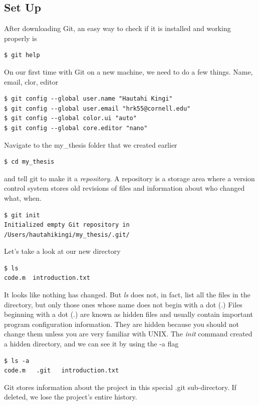 \documentclass{article}
\begin{document}
\subsection{Set Up}
After downloading Git, an easy way to check if it is installed and working properly is
\begin{lstlisting}
$ git help
\end{lstlisting}
On our first time with Git on a new machine, we need to do a few things. Name, email, clor, editor
\begin{lstlisting}
$ git config --global user.name "Hautahi Kingi"
$ git config --global user.email "hrk55@cornell.edu"
$ git config --global color.ui "auto"
$ git config --global core.editor "nano"
\end{lstlisting}
Navigate to the my\_thesis folder that we created earlier
\begin{lstlisting}
$ cd my_thesis
\end{lstlisting}
and tell git to make it a \emph{repository}. A repository is a storage area where a version control system stores old revisions of files and information about who changed what, when.
\begin{lstlisting}
$ git init
Initialized empty Git repository in /Users/hautahikingi/my_thesis/.git/
\end{lstlisting}
Let's take a look at our new directory
\begin{lstlisting}[frame=single]
$ ls
code.m	introduction.txt
\end{lstlisting}
It looks like nothing has changed. But \emph{ls} does not, in fact, list all the files in the directory, but only those ones whose name does not begin with a dot (.) Files beginning with a dot (.) are known as hidden files and usually contain important program configuration information. They are hidden because you should not change them unless you are very familiar with UNIX.  The \emph{init} command created a hidden directory, and we can see it by using the -a flag
\begin{lstlisting}[frame=single]
$ ls -a
code.m	 .git	introduction.txt
\end{lstlisting}
Git stores information about the project in this special .git sub-directory. If deleted, we lose the project's entire history.\\
\end{document}
